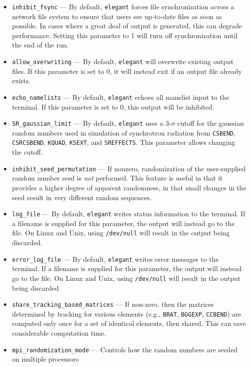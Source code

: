 \documentclass[11pt]{article}
\begin{document}
\begin{itemize}
\item \verb|inhibit_fsync| --- By default, \verb|elegant| forces file synchronization across a network file system
  to ensure that users see up-to-date files as soon as possible.  In cases where a great deal of output is generated,
  this can degrade performance.  Setting this parameter to 1 will turn off synchronization until the end of the run.
\item \verb|allow_overwriting| --- By default, \verb|elegant| will overwrite existing output files. If this parameter
  is set to 0, it will instead exit if an output file already exists.
\item \verb|echo_namelists| --- By default, \verb|elegant| echoes all namelist input to the terminal.  If this parameter
  is set to 0, this output will be inhibited.
\item \verb|SR_gaussian_limit| --- By default, \verb|elegant| uses a 3-$\sigma$ cutoff for the gaussian random numbers used
  in simulation of synchrotron radiation from \verb|CSBEND|, \verb|CSRCSBEND|, \verb|KQUAD|, \verb|KSEXT|, and \verb|SREFFECTS|.
  This parameter allows changing the cutoff.
\item \verb|inhibit_seed_permutation| --- If nonzero, randomization of the user-supplied random number seed is {\em not} performed.
  This feature is useful in that it provides a higher degree of apparent randomness, in that small changes in the seed result
  in very different random sequences.
\item \verb|log_file| --- By default, \verb|elegant| writes status information to the terminal.  If a filename is supplied
  for this parameter, the output will instead go to the file.  On Linux and Unix, using \verb|/dev/null| will result in 
  the output being discarded.
\item \verb|error_log_file| --- By default, \verb|elegant| writes error messages to the terminal.  If a filename is supplied
  for this parameter, the output will instead go to the file.  On Linux and Unix, using \verb|/dev/null| will result in 
  the output being discarded.
\item \verb|share_tracking_based_matrices| --- If non-zero, then the matrices determined by tracking for various elements
  (e.g., \verb|BRAT|, \verb|BGGEXP|, \verb|CCBEND|) are computed only once for a set of identical elements, then shared.
  This can save considerable computation time.
\item \verb|mpi_randomization_mode| --- Controls how the random numbers are seeded on multiple processors

\end{itemize}
\end{document}
